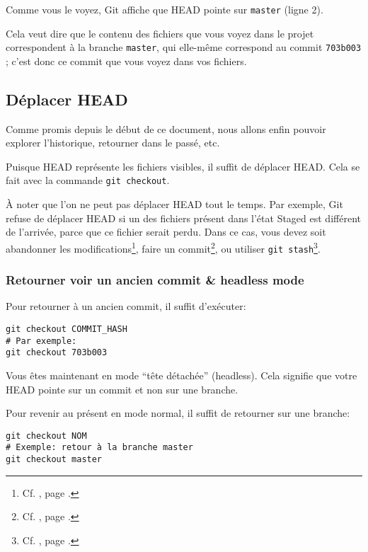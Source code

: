 \documentclass[10pt,a4paper]{article}
\begin{document}
Comme vous le voyez, Git affiche que HEAD pointe sur {\tt master} (ligne 2).

Cela veut dire que le contenu des fichiers que vous voyez dans le projet correspondent à la branche {\tt master}, qui elle-même correspond au commit {\tt 703b003} ; c'est donc ce commit que vous voyez dans vos fichiers.

\subsection{Déplacer HEAD\label{move-head}}

Comme promis depuis le début de ce document, nous allons enfin pouvoir explorer l'historique, retourner dans le passé, etc.

Puisque HEAD représente les fichiers visibles, il suffit de déplacer HEAD. Cela se fait avec la commande \texttt{git checkout}.

À noter que l'on ne peut pas déplacer HEAD tout le temps. Par exemple, Git refuse de déplacer HEAD si un des fichiers présent dans l'état Staged est différent de l'arrivée, parce que ce fichier serait perdu.
Dans ce cas, vous devez soit abandonner les modifications\footnote{Cf. , page \pageref{staged-unstaged}.},
faire un commit\footnote{Cf. , page \pageref{commit}.},
ou utiliser {\tt git stash}\footnote{Cf. , page \pageref{stash}.}.

\subsubsection{Retourner voir un ancien commit \& headless mode}

Pour retourner à un ancien commit, il suffit d'exécuter:

\begin{verbatim}
git checkout COMMIT_HASH
# Par exemple:
git checkout 703b003
\end{verbatim}

Vous êtes maintenant en mode ``tête détachée'' (headless). Cela signifie que votre HEAD pointe sur un commit et non sur une branche.

Pour revenir au présent en mode normal, il suffit de retourner sur une branche:

\begin{verbatim}
git checkout NOM
# Exemple: retour à la branche master
git checkout master
\end{verbatim}
\end{document}

